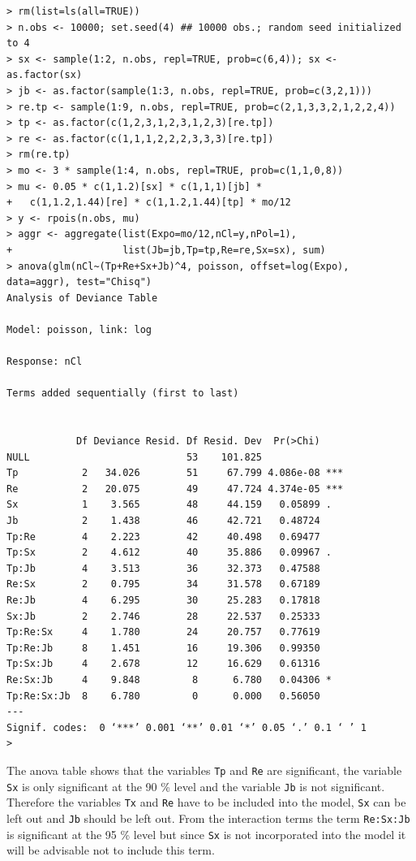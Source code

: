 \documentclass[11pt]{article}
\begin{document}
\begin{verbatim}
> rm(list=ls(all=TRUE))
> n.obs <- 10000; set.seed(4) ## 10000 obs.; random seed initialized to 4
> sx <- sample(1:2, n.obs, repl=TRUE, prob=c(6,4)); sx <- as.factor(sx)
> jb <- as.factor(sample(1:3, n.obs, repl=TRUE, prob=c(3,2,1)))
> re.tp <- sample(1:9, n.obs, repl=TRUE, prob=c(2,1,3,3,2,1,2,2,4))
> tp <- as.factor(c(1,2,3,1,2,3,1,2,3)[re.tp])
> re <- as.factor(c(1,1,1,2,2,2,3,3,3)[re.tp])
> rm(re.tp)
> mo <- 3 * sample(1:4, n.obs, repl=TRUE, prob=c(1,1,0,8))
> mu <- 0.05 * c(1,1.2)[sx] * c(1,1,1)[jb] *
+   c(1,1.2,1.44)[re] * c(1,1.2,1.44)[tp] * mo/12
> y <- rpois(n.obs, mu)
> aggr <- aggregate(list(Expo=mo/12,nCl=y,nPol=1),
+                   list(Jb=jb,Tp=tp,Re=re,Sx=sx), sum)
> anova(glm(nCl~(Tp+Re+Sx+Jb)^4, poisson, offset=log(Expo), data=aggr), test="Chisq")
Analysis of Deviance Table

Model: poisson, link: log

Response: nCl

Terms added sequentially (first to last)


            Df Deviance Resid. Df Resid. Dev  Pr(>Chi)    
NULL                           53    101.825              
Tp           2   34.026        51     67.799 4.086e-08 ***
Re           2   20.075        49     47.724 4.374e-05 ***
Sx           1    3.565        48     44.159   0.05899 .  
Jb           2    1.438        46     42.721   0.48724    
Tp:Re        4    2.223        42     40.498   0.69477    
Tp:Sx        2    4.612        40     35.886   0.09967 .  
Tp:Jb        4    3.513        36     32.373   0.47588    
Re:Sx        2    0.795        34     31.578   0.67189    
Re:Jb        4    6.295        30     25.283   0.17818    
Sx:Jb        2    2.746        28     22.537   0.25333    
Tp:Re:Sx     4    1.780        24     20.757   0.77619    
Tp:Re:Jb     8    1.451        16     19.306   0.99350    
Tp:Sx:Jb     4    2.678        12     16.629   0.61316    
Re:Sx:Jb     4    9.848         8      6.780   0.04306 *  
Tp:Re:Sx:Jb  8    6.780         0      0.000   0.56050    
---
Signif. codes:  0 ‘***’ 0.001 ‘**’ 0.01 ‘*’ 0.05 ‘.’ 0.1 ‘ ’ 1
>
\end{verbatim}

The anova table shows that the variables \verb|Tp| and \verb|Re| are significant, the variable \verb|Sx| is only significant at the 90 \% level and the variable \verb|Jb| is not significant. Therefore the variables \verb|Tx| and \verb|Re| have to be included into the model, \verb|Sx| can be left out and \verb|Jb| should be left out. From the interaction terms the term \verb|Re:Sx:Jb| is significant at the 95 \% level but since \verb|Sx| is not incorporated into the model it will be advisable not to include this term.
\end{document}
